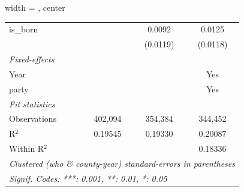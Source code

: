 \begin{adjustbox}{width = \textwidth, center}
\begin{tabular}{lccc}
      is\_born                          &                 & 0.0092          & 0.0125\\   
                                        &                 & (0.0119)        & (0.0118)\\   
      \midrule
      \emph{Fixed-effects}\\
      Year                              &                 &                 & Yes\\  
      party                             &                 &                 & Yes\\  
      \midrule
      \emph{Fit statistics}\\
      Observations                      & 402,094         & 354,384         & 344,452\\  
      R$^2$                             & 0.19545         & 0.19330         & 0.20087\\  
      Within R$^2$                      &                 &                 & 0.18336\\  
      \midrule \midrule
      \multicolumn{4}{l}{\emph{Clustered (who \& county-year) standard-errors in parentheses}}\\
      \multicolumn{4}{l}{\emph{Signif. Codes: ***: 0.001, **: 0.01, *: 0.05}}\\
   \end{tabular}
\end{adjustbox}
\par\endgroup


